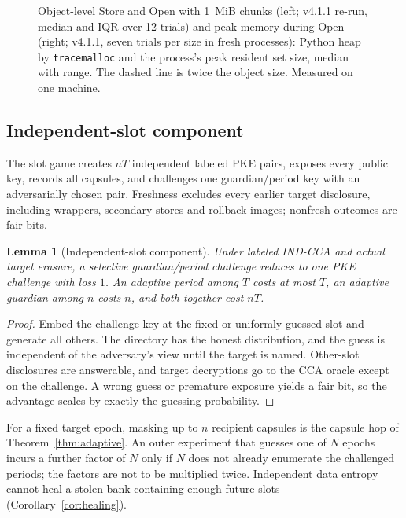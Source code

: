 \documentclass[pdflatex,sn-mathphys-num,twocolumn]{sn-jnl}
\theoremstyle{plain}
\newtheorem{lemma}[theorem]{Lemma}
\theoremstyle{definition}
\newcommand{\code}[1]{\texttt{#1}}
\begin{document}
\begin{figure}[t]
\centering

\caption{Object-level Store and Open with 1~MiB chunks (left; v4.1.1 re-run, median and IQR over 12 trials) and peak memory during Open (right; v4.1.1, seven trials per size in fresh processes): Python heap by \code{tracemalloc} and the process's peak resident set size, median with range. The dashed line is twice the object size. Measured on one machine.}\label{fig:objects}
\end{figure}

\subsection{Independent-slot component}\label{sec:slots}
The slot game creates $nT$ independent labeled PKE pairs, exposes every public key, records all capsules, and challenges one guardian/period key with an adversarially chosen pair. Freshness excludes every earlier target disclosure, including wrappers, secondary stores and rollback images; nonfresh outcomes are fair bits.

\begin{lemma}[Independent-slot component]\label{lem:slot}
Under labeled IND-CCA and actual target erasure, a selective guardian/period challenge reduces to one PKE challenge with loss $1$. An adaptive period among $T$ costs at most $T$, an adaptive guardian among $n$ costs $n$, and both together cost $nT$.
\end{lemma}
\begin{proof}
Embed the challenge key at the fixed or uniformly guessed slot and generate all others. The directory has the honest distribution, and the guess is independent of the adversary's view until the target is named. Other-slot disclosures are answerable, and target decryptions go to the CCA oracle except on the challenge. A wrong guess or premature exposure yields a fair bit, so the advantage scales by exactly the guessing probability.
\end{proof}

For a fixed target epoch, masking up to $n$ recipient capsules is the capsule hop of Theorem~\ref{thm:adaptive}. An outer experiment that guesses one of $N$ epochs incurs a further factor of $N$ only if $N$ does not already enumerate the challenged periods; the factors are not to be multiplied twice. Independent data entropy cannot heal a stolen bank containing enough future slots (Corollary~\ref{cor:healing}).
\end{document}
